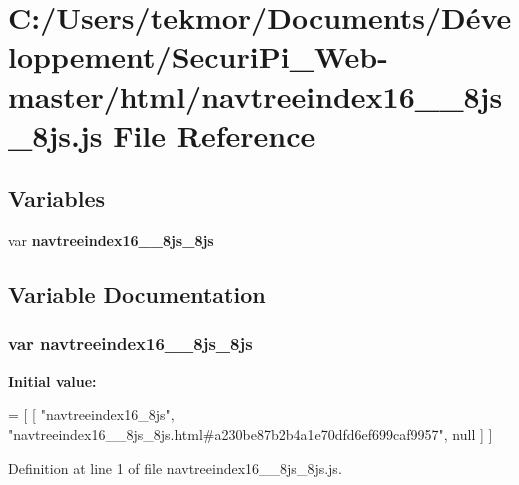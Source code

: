 \section{C\+:/\+Users/tekmor/\+Documents/\+Développement/\+Securi\+Pi\+\_\+\+Web-\/master/html/navtreeindex16\+\_\+\+\_\+8js\+\_\+8js.js File Reference}
\label{navtreeindex16____8js__8js_8js}
\subsection*{Variables}
\begin{DoxyCompactItemize}
\item 
var {\bf navtreeindex16\+\_\+\+\_\+8js\+\_\+8js}
\end{DoxyCompactItemize}


\subsection{Variable Documentation}
\subsubsection[{navtreeindex16\+\_\+\+\_\+8js\+\_\+8js}]{\setlength{\rightskip}{0pt plus 5cm}var navtreeindex16\+\_\+\+\_\+8js\+\_\+8js}\label{navtreeindex16____8js__8js_8js_a4cf3c53338875ff712a25b7a74caa91b}
{\bfseries Initial value\+:}
\begin{DoxyCode}
=
[
    [ \textcolor{stringliteral}{"navtreeindex16\_8js"}, \textcolor{stringliteral}{"navtreeindex16\_\_8js\_8js.html#a230be87b2b4a1e70dfd6ef699caf9957"}, null ]
]
\end{DoxyCode}


Definition at line 1 of file navtreeindex16\+\_\+\+\_\+8js\+\_\+8js.\+js.

